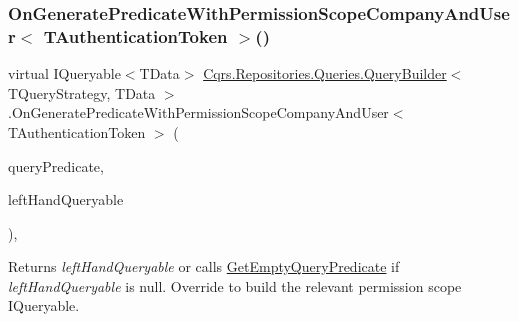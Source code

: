 \subsubsection{\texorpdfstring{On\+Generate\+Predicate\+With\+Permission\+Scope\+Company\+And\+User$<$ T\+Authentication\+Token $>$()}{OnGeneratePredicateWithPermissionScopeCompanyAndUser< TAuthenticationToken >()}}
{\footnotesize\ttfamily virtual I\+Queryable$<$T\+Data$>$ \hyperlink{classCqrs_1_1Repositories_1_1Queries_1_1QueryBuilder}{Cqrs.\+Repositories.\+Queries.\+Query\+Builder}$<$ T\+Query\+Strategy, T\+Data $>$.On\+Generate\+Predicate\+With\+Permission\+Scope\+Company\+And\+User$<$ T\+Authentication\+Token $>$ (\begin{DoxyParamCaption}\item[{\hyperlink{classCqrs_1_1Repositories_1_1Queries_1_1QueryPredicate}{Query\+Predicate}}]{query\+Predicate,  }\item[{I\+Queryable$<$ T\+Data $>$}]{left\+Hand\+Queryable }\end{DoxyParamCaption})\hspace{0.3cm}{\ttfamily [protected]}, {\ttfamily [virtual]}}



Returns {\itshape left\+Hand\+Queryable}  or calls \hyperlink{classCqrs_1_1Repositories_1_1Queries_1_1QueryBuilder_a7dc8f0da3bb4ef54b8cbdda6c50ee0a1_a7dc8f0da3bb4ef54b8cbdda6c50ee0a1}{Get\+Empty\+Query\+Predicate} if {\itshape left\+Hand\+Queryable}  is null. Override to build the relevant permission scope I\+Queryable. 

\mbox{\label{classCqrs_1_1Repositories_1_1Queries_1_1QueryBuilder_a314592206fd5d2a25866227cc547dd6b_a314592206fd5d2a25866227cc547dd6b}} 
